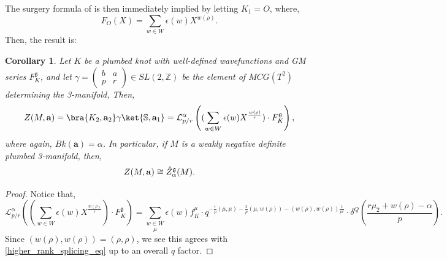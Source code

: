 \documentclass{article}
\def\be{\begin{equation}}
\def\ee{\end{equation}}
\newtheorem{corollary}{Corollary}
\numberwithin{corollary}{theorem}
\numberwithin{corollary}{proposition}
\begin{document}
The surgery formula of \cite{P3} is then immediately implied by letting $K_1 = O$, where, 
$$F_O(X) = \sum_{w\in W}\epsilon(w) X^{w(\rho)}.$$
Then, the result is: 
\begin{corollary}
     Let $K$ be a plumbed knot with well-defined wavefunctions and GM series $F_K^\mathfrak{g}$, and let $\gamma = \begin{pmatrix}
        b&a\\ p&r
    \end{pmatrix} \in SL(2,\mathbb{Z})$ be the element of $MCG(T^2)$ determining the 3-manifold, Then,
    \be Z(M,\mathbf{a}) = \bra{K_2,\mathbf{a}_2}\gamma\ket{\mathbb{S},\mathbf{a}_1} =\mathcal{L}^\alpha_{p/r}\left((\sum_{w\in W}\epsilon(w)X^{\frac{w(\rho)}{r}})\cdot F^\mathfrak{g}_K\right),  \ee
    where again, $Bk(\mathbf{a}) = \alpha$. In particular, if $M$ is a weakly negative definite plumbed 3-manifold, then, 
    $$Z(M,\mathbf{a}) \cong \Hat{Z}^\mathfrak{g}_\alpha (M) .$$
\end{corollary}
\begin{proof}
    Notice that, 
$$\mathcal{L}^\alpha_{p/r}\left((\sum_{w\in W}\epsilon(w)X^{\frac{w(\rho)}{r}})\cdot F^\mathfrak{g}_K\right) = \underset{\mu}{\sum_{w\in W}} \epsilon(w) f^\mu_K \cdot q^{-\frac{r}{p}(\mu,\mu) -\frac{2}{p}(\mu,w(\rho)) -(w(\rho),w(\rho))\frac{1}{pr}} \cdot \delta^Q\left( \frac{r \mu_2 +w(\rho) - \alpha}{p}\right). $$
Since $(w(\rho),w(\rho)) = (\rho,\rho)$, we see this agrees with \eqref{higher_rank_splicing_eq} up to an overall $q$ factor.
\end{proof}
\end{document}
